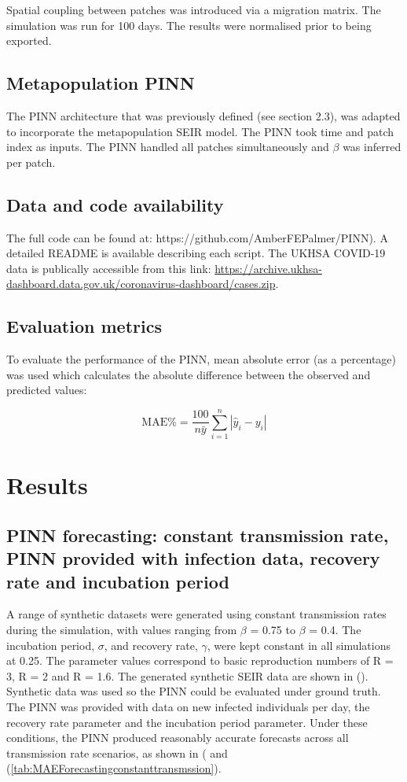 \documentclass{article}
\begin{document}
Spatial coupling between patches was introduced via a migration matrix. The simulation was run for 100 days. The results were normalised prior to being exported.

\subsection{Metapopulation PINN}

The PINN architecture that was previously defined (see section 2.3), was adapted to incorporate the metapopulation SEIR model. The PINN took time and patch index as inputs. The PINN handled all patches simultaneously and $\beta$ was inferred per patch.


\subsection{Data and code availability}
The full code can be found at: https://github.com/AmberFEPalmer/PINN). A detailed README is available describing each script. The UKHSA COVID-19 data is publically accessible from this link: \href{}{https://archive.ukhsa-dashboard.data.gov.uk/coronavirus-dashboard/cases.zip}.

\subsection{Evaluation metrics}

To evaluate the performance of the PINN, mean absolute error (as a percentage) was used which calculates the absolute difference between the observed and predicted values:

\begin{equation}
    \text{MAE\%} = \frac{100}{n \bar{y}} \sum_{i=1}^{n} \left| \hat{y}_i - y_i \right|
\end{equation}


\section{Results}

\subsection{PINN forecasting: constant transmission rate, PINN provided with infection data, recovery rate and incubation period}

A range of synthetic datasets were generated using constant transmission rates during the simulation, with values ranging from $\beta$ = 0.75 to $\beta$ = 0.4. The incubation period, $\sigma$, and recovery rate, $\gamma$, were kept constant in all simulations at 0.25. The parameter values correspond to basic reproduction numbers of R = 3, R = 2 and R = 1.6. The generated synthetic SEIR data are shown in (). Synthetic data was used so the PINN could be evaluated under ground truth. The PINN was provided with data on new infected individuals per day, the recovery rate parameter and the incubation period parameter. Under these conditions, the PINN produced reasonably accurate forecasts across all transmission rate scenarios, as shown in ( and (\cref{tab:MAEForecastingconstanttransmssion}). 
\end{document}
